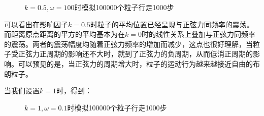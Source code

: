 \documentclass[a4paper,11pt]{article}
\begin{document}
\begin{figure}[!htbp]   
\centering     
{}
\caption{$k=0.5,\omega=100$时模拟100000个粒子行走1000步}      
\end{figure}


\newpage 可以看出在影响因子$k=0.5$时粒子的平均位置已经呈现与正弦力同频率的震荡。而距离原点距离的平方的平均基本为在$k=0$时的线性关系上叠加与正弦力同频率的震荡。两者的震荡幅度均随着正弦力频率的增加而减少，这点也很好理解，当粒子受正弦力正周期的影响还不大时，就到了正弦力的负周期，从而低消正周期的影响。可以预见的是，当正弦力的周期增大时，粒子的运动行为越来越接近自由的布朗粒子。

当我们设置$k=1$时，得到：

\begin{figure}[!htbp]   
\centering     
{}
\caption{$k=1,\omega=0.1$时模拟100000个粒子行走1000步}      
\end{figure}
\end{document}
